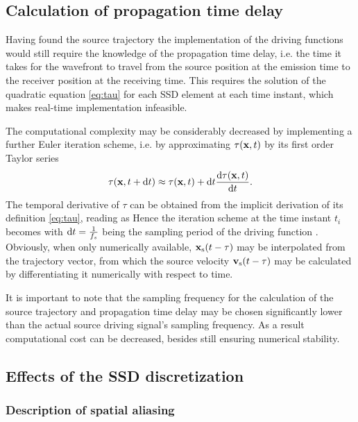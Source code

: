 \subsection{Calculation of propagation time delay}
	
Having found the source trajectory the implementation of the driving functions would still require the knowledge of the propagation time delay, i.e. the time it takes for the wavefront to travel from the source position at the emission time to the receiver position at the receiving time.
This requires the solution of the quadratic equation \eqref{eq:tau} for each SSD element at each time instant, which makes real-time implementation infeasible.

The computational complexity may be considerably decreased by implementing a further Euler iteration scheme, i.e. by approximating $\tau(\mathbf{x},t)$ by its first order Taylor series
\begin{equation}
\tau(\mathbf{x},t+\mathrm{d} t) \approx \tau(\mathbf{x},t) + \mathrm{d} t \frac{\mathrm{d} \tau(\mathbf{x},t)}{\mathrm{d} t}.
\end{equation}
The temporal derivative of $\tau$ can be obtained from the implicit derivation of its definition \eqref{eq:tau}, reading as
Hence the iteration scheme at the time instant $t_i$ becomes
with $\mathrm{d} t = \frac{1}{f_s}$ being the sampling period of the driving function \cite{doi:10.1121/1.4996126}.
Obviously, when only numerically available, $\mathbf{x}_{\mathrm{s}}(t-\tau)$ may be interpolated from the trajectory vector, from which the source velocity $\mathbf{v}_{\mathrm{s}}(t-\tau)$ may be calculated by differentiating it numerically with respect to time.

It is important to note that the sampling frequency for the calculation of the source trajectory and propagation time delay may be chosen significantly lower than the actual source driving signal's sampling frequency.
As a result computational cost can be decreased, besides still ensuring numerical stability. 

\subsection{Effects of the SSD discretization}

\subsubsection{Description of spatial aliasing}


